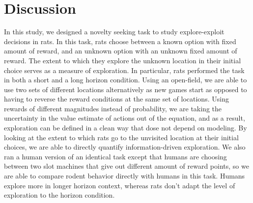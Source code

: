 \documentclass[12pt]{article}
\begin{document}
\section*{Discussion}

In this study, we designed a novelty seeking task to study explore-exploit decisions in rats. In this task, rats choose between a known option with fixed amount of reward, and an unknown option with an unknown fixed amount of reward. The extent to which they explore the unknown location in their initial choice serves as a measure of exploration. In particular, rats performed the task in both a short and a long horizon condition. Using an open-field, we are able to use two sets of different locations alternatively as new games start as opposed to having to reverse the reward conditions at the same set of locations. Using rewards of different magnitudes instead of probability, we are taking the uncertainty in the value estimate of actions out of the equation, and as a result, exploration can be defined in a clean way that dose not depend on modeling. By looking at the extent to which rats go to the unvisited location at their initial choices, we are able to directly quantify information-driven exploration. We also ran a human version of an identical task except that humans are choosing between two slot machines that give out different amount of reward points, so we are able to compare rodent behavior directly with humans in this task. Humans explore more in longer horizon context, whereas rats don't adapt the level of exploration to the horizon condition. 


\end{document}
